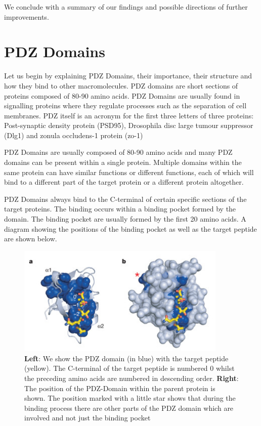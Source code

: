 \documentclass[a4paper, 12pt]{article}
\begin{document}
	We conclude with a summary of our findings and possible directions of further improvements. 

	\section{PDZ Domains}

	Let us begin by explaining PDZ Domains, their importance, their structure and how they bind to other macromolecules. PDZ domains are short sections of proteins composed of 80-90 amino acids. PDZ Domains are usually found in signalling proteins where they regulate processes such as the separation of cell membranes. PDZ itself is an acronym for the first three letters of three proteins: Post-synaptic density protein (PSD95), Drosophila disc large tumour suppressor (Dlg1) and zonula occludens-1 protein (zo-1)

	PDZ Domains are usually composed of 80-90 amino acids and many PDZ domains can be present within a single protein. Multiple domains within the same protein can have similar functions or different functions, each of which will bind to a different part of the target protein or a different protein altogether.

	PDZ Domains always bind to the C-terminal of certain specific sections of the target proteins. The binding occurs within a binding pocket formed by the domain. The binding pocket are usually formed by the first 20 amino acids. A diagram showing the positions of the binding pocket as well as the target peptide are shown below. 

	\begin{figure}
	\label{PDZ_Positions}
	\centering
	\includegraphics[width=10cm]{Images/pdz.jpg}
	\caption{\textbf{Left}: We show the PDZ domain (in blue) with the target peptide (yellow). The C-terminal of the target peptide is numbered 0 whilst the preceding amino acids are numbered in descending order. 
	\textbf{Right}: The position of the PDZ-Domain within the parent protein is shown. The position marked with a little star shows that during the binding process there are other parts of the PDZ domain which are involved and not just the binding pocket}
	\end{figure}	
\end{document}
